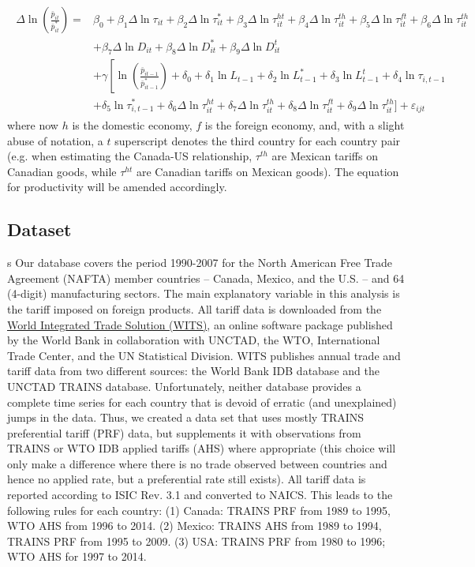 \begin{align}
\begin{split}\label{eq:gw-estimation-prices-third-country}
\Delta \ln \left( \frac{\bar{p}_{it}}{\bar{p}_{it}^*} \right) = 
&\beta_0 + \beta_1 \Delta \ln \tau_{it} + \beta_2 \Delta \ln \tau_{it}^* + \beta_3 \Delta \ln \tau_{it}^{ht} 
+ \beta_4 \Delta \ln \tau_{it}^{th} + \beta_5 \Delta \ln \tau_{it}^{ft} + \beta_6 \Delta \ln \tau_{it}^{th} \\ 
&+ \beta_7 \Delta \ln D_{it} + \beta_8 \Delta \ln D_{it}^* + \beta_9 \Delta \ln D_{it}^t \\ 
&+ \gamma \left[ \ln \left( \frac{\bar{p}_{it-1}}{\bar{p}_{it-1}^*} \right) + \delta_0 + \delta_1 \ln L_{t-1} + \delta_2\ln L_{t-1}^* 
 + \delta_3 \ln L_{t-1}^t+ \delta_4 \ln \tau_{i,t-1} \right. \\ 
&+ \left. \delta_5 \ln  \tau_{i,t-1}^*  + \delta_6 \Delta \ln \tau_{it}^{ht} + \delta_7 \Delta \ln \tau_{it}^{th} 
 + \delta_8 \Delta \ln \tau_{it}^{ft} + \delta_9 \Delta \ln \tau_{it}^{th} \bigg] \right. + \varepsilon_{ijt} 
\end{split}\end{align}
where now $h$ is the domestic economy, $f$ is the foreign economy, and, with a slight abuse of notation, a $t$ superscript denotes the third country for each country pair (e.g. when estimating the Canada-US relationship, $\tau^{th}$ are Mexican tariffs on Canadian goods, while $\tau^{ht}$ are Canadian tariffs on Mexican goods). The equation for productivity will be amended accordingly. 

\subsection{Dataset}
s
Our database covers the period 1990-2007 for the North American Free Trade Agreement 
(NAFTA) member countries -- Canada, Mexico, and the U.S. -- and 64 (4-digit) manufacturing sectors. 
The main explanatory variable in this analysis is the tariff imposed on foreign 
products. All tariff data is downloaded from the \href{http://wits.worldbank.org/Default.aspx}{World Integrated Trade Solution (WITS)},
 an online software package published by the World Bank in collaboration with 
UNCTAD, the WTO, International Trade Center, and the UN Statistical Division. 
WITS publishes annual trade and tariff data from two different sources: the World
 Bank IDB database and the UNCTAD TRAINS database. Unfortunately, neither database 
provides a complete time series for each country that is devoid of erratic 
(and unexplained) jumps in the data. Thus, we created a data set that uses mostly 
TRAINS preferential tariff (PRF) data, but supplements it with observations from 
TRAINS or WTO IDB applied tariffs (AHS) where appropriate (this choice will only 
make a difference where there is no trade observed between countries and hence 
no applied rate, but a preferential rate still exists). All tariff data is reported 
according to ISIC Rev. 3.1 and converted to NAICS. This leads to the following 
rules for each country: (1) Canada: TRAINS PRF from 1989 to 1995, WTO AHS from 
1996 to 2014. (2) Mexico: TRAINS AHS from 1989 to 1994, TRAINS PRF from 1995 to 2009. 
(3) USA: TRAINS PRF from 1980 to 1996; WTO AHS for 1997 to 2014.

